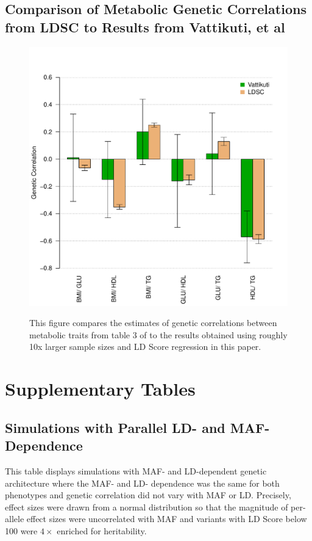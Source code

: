 \documentclass[11pt]{article}
\numberwithin{equation}{section}
\numberwithin{definition}{section}
\numberwithin{thm}{section}
\numberwithin{lemma}{section}
\numberwithin{prop}{section}
\numberwithin{cor}{section}
\numberwithin{hyp}{section}
\begin{document}
\subsection{Comparison of Metabolic Genetic Correlations from LDSC to Results from Vattikuti, et al}
\begin{figure}[!ht]

\begin{centering}
    \includegraphics[scale=0.8]{figs/vattikuti.pdf}
         \label{vattikuti}

This figure compares the estimates of genetic correlations between metabolic traits from table 3 of \cite{vattikuti2012heritability}
to the results obtained using roughly 10x larger sample sizes and LD Score regression in this paper.
\end{centering}
\end{figure}

\newpage
\section{Supplementary Tables}

\subsection{Simulations with Parallel LD- and MAF-Dependence}
\label{parallel}

This table displays simulations with MAF- and LD-dependent genetic architecture where the MAF- and LD- dependence was the same for both phenotypes and genetic correlation did not vary with MAF or LD. Precisely, effect sizes were drawn from a normal distribution so that the magnitude of per-allele effect sizes were uncorrelated with MAF and variants with LD Score below 100 were $4\times$ enriched for heritability.
\end{document}
